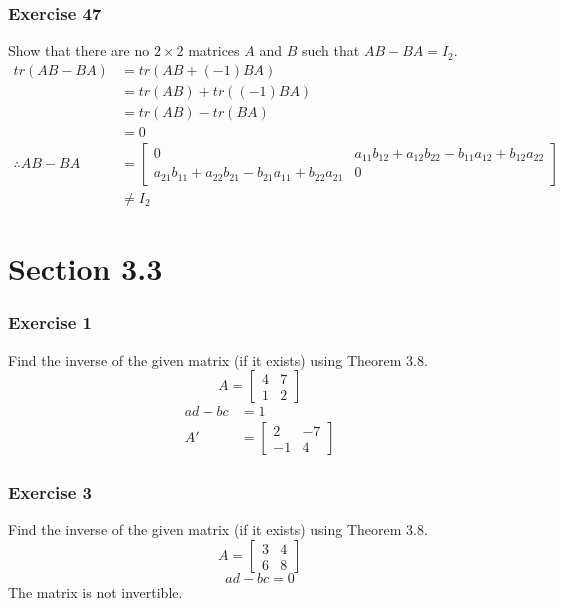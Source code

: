 \documentclass{math}
\begin{document}
\subsubsection*{Exercise 47}
Show that there are no \( 2\times2 \) matrices \( A \) and \( B \) such that
\( AB-BA = I_2 \).
\begin{align*}
  tr(AB-BA) &= tr(AB+(-1)BA) \\
  &= tr(AB)+tr((-1)BA) \\
  &= tr(AB)-tr(BA) \\
  &= 0 \\
  \therefore AB-BA &= \begin{bmatrix}
    0 & a_{11}b_{12}+a_{12}b_{22}-b_{11}a_{12}+b_{12}a_{22} \\
    a_{21}b_{11}+a_{22}b_{21}-b_{21}a_{11}+b_{22}a_{21} & 0
  \end{bmatrix} \\
  &\ne I_2
\end{align*}

\section*{Section 3.3}

\subsubsection*{Exercise 1}
Find the inverse of the given matrix (if it exists) using Theorem 3.8.
\[ A = \begin{bmatrix}4 & 7 \\ 1 & 2\end{bmatrix} \]
\begin{align*}
  ad-bc &= 1 \\
  A' &= \begin{bmatrix}
    2 & -7 \\
    -1 & 4
  \end{bmatrix}
\end{align*}

\subsubsection*{Exercise 3}
Find the inverse of the given matrix (if it exists) using Theorem 3.8.
\[ A = \begin{bmatrix}3 & 4 \\ 6 & 8\end{bmatrix} \]
\[ ad-bc = 0 \]
The matrix is not invertible.
\end{document}
